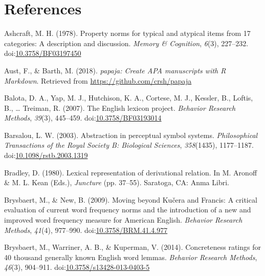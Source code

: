 \documentclass[english,,man]{apa6}
\theoremstyle{definition}
\theoremstyle{definition}
\theoremstyle{definition}
\theoremstyle{remark}
\begin{document}
\newpage

\hypertarget{references}{%
\section{References}\label{references}}

\setlength{\parindent}{-0.5in}
\setlength{\leftskip}{0.5in}

\hypertarget{refs}{}
\leavevmode\hypertarget{ref-Ashcraft1978a}{}%
Ashcraft, M. H. (1978). Property norms for typical and atypical items
from 17 categories: A description and discussion. \emph{Memory \&
Cognition}, \emph{6}(3), 227--232.
doi:\href{https://doi.org/10.3758/BF03197450}{10.3758/BF03197450}

\leavevmode\hypertarget{ref-R-papaja}{}%
Aust, F., \& Barth, M. (2018). \emph{papaja: Create APA manuscripts with
R Markdown}. Retrieved from \url{https://github.com/crsh/papaja}

\leavevmode\hypertarget{ref-Balota2007}{}%
Balota, D. A., Yap, M. J., Hutchison, K. A., Cortese, M. J., Kessler,
B., Loftis, B., \ldots{} Treiman, R. (2007). The English lexicon
project. \emph{Behavior Research Methods}, \emph{39}(3), 445--459.
doi:\href{https://doi.org/10.3758/BF03193014}{10.3758/BF03193014}

\leavevmode\hypertarget{ref-Barsalou2003}{}%
Barsalou, L. W. (2003). Abstraction in perceptual symbol systems.
\emph{Philosophical Transactions of the Royal Society B: Biological
Sciences}, \emph{358}(1435), 1177--1187.
doi:\href{https://doi.org/10.1098/rstb.2003.1319}{10.1098/rstb.2003.1319}

\leavevmode\hypertarget{ref-Bradley1980}{}%
Bradley, D. (1980). Lexical representation of derivational relation. In
M. Aronoff \& M. L. Kean (Eds.), \emph{Juncture} (pp. 37--55). Saratoga,
CA: Anma Libri.

\leavevmode\hypertarget{ref-Brysbaert2009}{}%
Brysbaert, M., \& New, B. (2009). Moving beyond Kučera and Francis: A
critical evaluation of current word frequency norms and the introduction
of a new and improved word frequency measure for American English.
\emph{Behavior Research Methods}, \emph{41}(4), 977--990.
doi:\href{https://doi.org/10.3758/BRM.41.4.977}{10.3758/BRM.41.4.977}

\leavevmode\hypertarget{ref-Brysbaert2013}{}%
Brysbaert, M., Warriner, A. B., \& Kuperman, V. (2014). Concreteness
ratings for 40 thousand generally known English word lemmas.
\emph{Behavior Research Methods}, \emph{46}(3), 904--911.
doi:\href{https://doi.org/10.3758/s13428-013-0403-5}{10.3758/s13428-013-0403-5}
\end{document}
